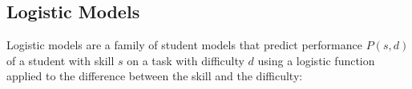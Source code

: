 %
%
%


\subsection{Logistic Models}  %
\label{sec:elo}  %

Logistic models \cite{irt-visual-guide}  %
are a family of student models that predict performance $P(s, d)$
of a student with skill $s$ on a task with difficulty $d$
using a logistic function applied to the difference between the skill and the difficulty:

